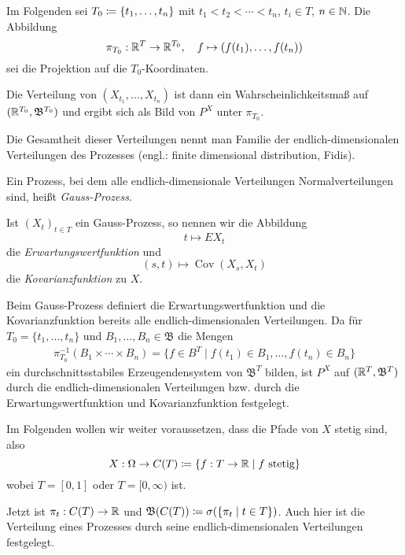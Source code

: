 \documentclass[a4paper,twoside,DIV15,BCOR12mm]{scrbook}
\newcommand{\borel}{{\mathfrak B}}
\begin{document}
Im Folgenden sei $T_0 \da\{t_1,\ldots,t_n\}$ mit $t_1<t_2<\cdots<t_n$, $t_i\in T$, $n\in \mathbb{N}$. Die Abbildung
\[
\pi_{T_0}:\mathbb{R}^T \to \mathbb{R}^{T_0},\quad f\mapsto (f(t_1),\ldots,f(t_n))
\]
sei die Projektion auf die $T_{0}$-Koordinaten.

Die Verteilung von $(X_{t_1},\ldots,X_{t_n})$ ist dann ein Wahrscheinlichkeitsmaß auf $(\MdR^{T_0},\borel^{T_0})$ und ergibt sich als Bild von $P^X$ unter $\pi_{T_0}$.

Die Gesamtheit dieser Verteilungen nennt man Familie der endlich-dimensionalen Verteilungen des Prozesses (engl.: finite dimensional distribution, Fidis).

\begin{definition}
Ein Prozess, bei dem alle endlich-dimensionale Verteilungen Normalverteilungen sind, heißt \emph{Gauss-Prozess}.

Ist $(X_t)_{t\in T}$ ein Gauss-Prozess, so nennen wir die Abbildung \[ t\mapsto EX_t\] die \emph{Erwartungswertfunktion} und \[ (s,t)\mapsto \operatorname{Cov}(X_s,X_t)\] die \emph{Kovarianzfunktion} zu $X$.
\end{definition}

\begin{bemerkung}
Beim Gauss-Prozess definiert die Erwartungswertfunktion und die Kovarianzfunktion bereits alle endlich-dimensionalen Verteilungen. Da für $T_0=\{t_1,\ldots,t_n\}$ und $B_1,\ldots,B_n\in \borel$ die Mengen
\begin{align*}
\pi_{T_0}^{-1}(B_1\times \cdots \times B_n) = \{f\in B^T\mid f(t_1)\in B_1,\ldots,f(t_n)\in B_n\}
\end{align*}
ein durchschnittsstabiles Erzeugendensystem von $\borel^T$ bilden, ist $P^X$ auf $(\MdR^T,\borel^T)$ durch die endlich-dimensionalen Verteilungen bzw. durch die Erwartungswertfunktion und Kovarianzfunktion festgelegt.
\end{bemerkung}

Im Folgenden wollen wir weiter voraussetzen, dass die Pfade von $X$ stetig sind, also 
\[
X: \Omega \to C(T) \da \{f:T\to \MdR\mid f\text{ stetig}\}
\]
wobei $T=[0,1]$ oder $T=[0,\infty)$ ist.

Jetzt ist $\pi_t : C(T) \to \mathbb{R}$ und $\borel(C(T)) \da \sigma(\{\pi_t \mid t\in T\})$. Auch hier ist die Verteilung eines Prozesses durch seine endlich-dimensionalen Verteilungen festgelegt.
\end{document}
